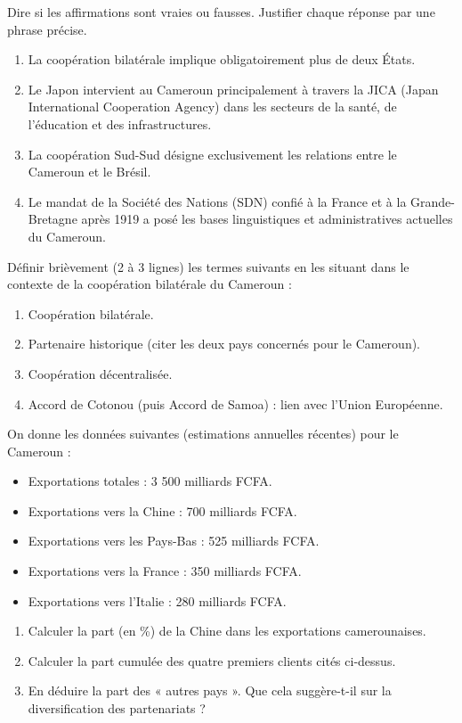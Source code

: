 \documentclass[11pt]{article}
\begin{document}
\begin{exercice}
Dire si les affirmations sont vraies ou fausses. Justifier chaque réponse par une phrase précise.
\begin{enumerate}
\item La coopération bilatérale implique obligatoirement plus de deux États.
\item Le Japon intervient au Cameroun principalement à travers la JICA (Japan International Cooperation Agency) dans les secteurs de la santé, de l'éducation et des infrastructures.
\item La coopération Sud-Sud désigne exclusivement les relations entre le Cameroun et le Brésil.
\item Le mandat de la Société des Nations (SDN) confié à la France et à la Grande-Bretagne après 1919 a posé les bases linguistiques et administratives actuelles du Cameroun.
\end{enumerate}
\end{exercice}

\begin{exercice}
Définir brièvement (2 à 3 lignes) les termes suivants en les situant dans le contexte de la coopération bilatérale du Cameroun :
\begin{enumerate}
\item Coopération bilatérale.
\item Partenaire historique (citer les deux pays concernés pour le Cameroun).
\item Coopération décentralisée.
\item Accord de Cotonou (puis Accord de Samoa) : lien avec l'Union Européenne.
\end{enumerate}
\end{exercice}

\begin{exercice}
On donne les données suivantes (estimations annuelles récentes) pour le Cameroun :
\begin{itemize}
\item Exportations totales : 3 500 milliards FCFA.
\item Exportations vers la Chine : 700 milliards FCFA.
\item Exportations vers les Pays-Bas : 525 milliards FCFA.
\item Exportations vers la France : 350 milliards FCFA.
\item Exportations vers l'Italie : 280 milliards FCFA.
\end{itemize}
\begin{enumerate}
\item Calculer la part (en \%) de la Chine dans les exportations camerounaises.
\item Calculer la part cumulée des quatre premiers clients cités ci-dessus.
\item En déduire la part des « autres pays ». Que cela suggère-t-il sur la diversification des partenariats ?
\end{enumerate}
\end{exercice}
\end{document}
